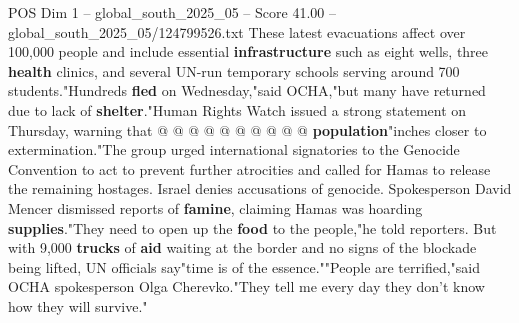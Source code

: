 \begin{textsample}{POS Dim 1 – global\_south\_2025\_05 – Score 41.00 – global\_south\_2025\_05/124799526.txt}
These latest evacuations affect over 100,000 people and include essential \textbf{infrastructure} such as eight wells, three \textbf{health} clinics, and several UN-run temporary schools serving around 700 students."Hundreds \textbf{fled} on Wednesday,"said OCHA,"but many have returned due to lack of \textbf{shelter}."Human Rights Watch issued a strong statement on Thursday, warning that @ @ @ @ @ @ @ @ @ @ \textbf{population}"inches closer to extermination."The group urged international signatories to the Genocide Convention to act to prevent further atrocities and called for Hamas to release the remaining hostages.
Israel denies accusations of genocide.
Spokesperson David Mencer dismissed reports of \textbf{famine}, claiming Hamas was hoarding \textbf{supplies}."They need to open up the \textbf{food} to the people,"he told reporters.
But with 9,000 \textbf{trucks} of \textbf{aid} waiting at the border and no signs of the blockade being lifted, UN officials say"time is of the essence.""People are terrified,"said OCHA spokesperson Olga Cherevko."They tell me every day they don't know how they will survive."

\end{textsample}
